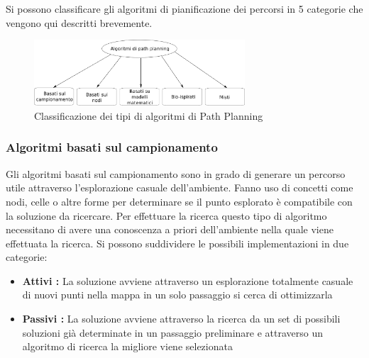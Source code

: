 Si possono classificare gli algoritmi di pianificazione dei percorsi in 5 categorie che vengono qui descritti brevemente.

\begin{figure}
	\centering
	\includegraphics[width=0.7\textwidth]{SistemaQuadrirotore/Figure/Path}
	\caption{Classificazione dei tipi di algoritmi di Path Planning \cite{YangLiang2016SoR3}}
	\label{fig:categoriecontrolli}
\end{figure}


\subsubsection{Algoritmi basati sul campionamento}

Gli algoritmi basati sul campionamento sono in grado di generare un percorso utile attraverso l'esplorazione casuale dell'ambiente. Fanno uso di concetti come nodi, celle o altre forme per determinare se il punto esplorato è compatibile con la soluzione da ricercare. Per effettuare la ricerca questo tipo di algoritmo necessitano di avere una conoscenza a priori dell'ambiente nella quale viene effettuata la ricerca.
Si possono suddividere le possibili implementazioni in due categorie:
\begin{itemize}
	\item \textbf{Attivi : } La soluzione avviene attraverso un esplorazione totalmente casuale di nuovi punti nella mappa in un solo passaggio si cerca di ottimizzarla
	\item \textbf{Passivi : }  La soluzione avviene attraverso la ricerca da un set di possibili soluzioni già determinate in un passaggio preliminare e attraverso un algoritmo di ricerca la migliore viene selezionata
\end{itemize}




